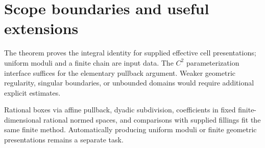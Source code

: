 \section{Scope boundaries and useful extensions}\label{sec:boundaries}

The theorem proves the integral identity for supplied effective cell
presentations; uniform moduli and a finite chain are input data.
The $C^2$ parameterization interface suffices for the elementary
pullback argument. Weaker geometric regularity, singular boundaries,
or unbounded domains would require additional explicit estimates.

Rational boxes via affine pullback, dyadic subdivision, coefficients
in fixed finite-dimensional rational normed spaces, and comparisons
with supplied fillings fit the same finite method. Automatically
producing uniform moduli or finite geometric presentations remains
a separate task.
